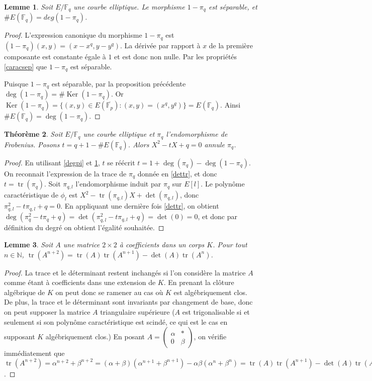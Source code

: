 \documentclass{article}
\theoremstyle{plain}%
\newtheorem{thm}{Théorème}[section]
\newtheorem{lem}[thm]{Lemme}
\theoremstyle{definition}%
\newcommand{\F}{\mathbb{F}}
\newcommand{\N}{\mathbb{N}}
\DeclareMathOperator{\tr}{tr}
\DeclareMathOperator{\Ker}{Ker}
\begin{document}
\begin{lem}
  \label{cardpi}
  Soit $E/\F_q$ une courbe elliptique. Le morphisme $1-\pi_q$ est séparable, et $\#E(\F_q) = deg(1 - \pi_q)$.
\end{lem}

\begin{proof}
  L'expression canonique du morphisme $1-\pi_q$ est $(1-\pi_q)(x, y) = (x-x^q, y-y^q)$. La dérivée par rapport à $x$ de la première composante est constante égale à $1$ et est donc non nulle. Par les propriétés \ref{caracsep} que $1-\pi_q$ est séparable.

  Puisque $1-\pi_q$ est séparable, par la proposition précédente $\deg(1-\pi_q) = \# \Ker(1-\pi_q)$. Or $\Ker(1-\pi_q) = \{(x, y) \in E(\overline{\F_p}) : (x, y) = (x^q, y^q) \} = E(\F_q)$. Ainsi $\# E(\F_q) = \deg(1-\pi_q)$.
\end{proof}

\begin{thm}
  \label{polcarac}
  Soit $E/\F_q$ une courbe elliptique et $\pi_q$ l'endomorphisme de Frobenius. Posons $t=q+1-\#E(\F_q)$. Alors $X^2 -tX + q = 0$ annule $\pi_q$.
\end{thm}

\begin{proof}
  En utilisant \ref{degpi} et \ref{cardpi}, $t$ se réécrit $t = 1 + \deg(\pi_q) - \deg(1-\pi_q)$. On reconnait l'expression de la trace de $\pi_q$ donnée en \ref{dettr}, et donc $t = \tr(\pi_q)$. Soit $\pi_{q, l}$ l'endomorphisme induit par $\pi_q$ sur $E[l]$. Le polynôme caractéristique de $\phi_l$ est $X^2 -\tr(\pi_{q,l}) X + \det(\pi_{q, l})$, donc $\pi_{q,l}^2 - t\pi_{q,l}+q = 0$. En appliquant une dernière fois \ref{dettr}, on obtient $\deg(\pi_{q}^2 - t\pi_{q}+q ) = \det (\pi_{q,l}^2 - t\pi_{q,l}+q ) = \det(0) = 0$, et donc par définition du degré on obtient l'égalité souhaitée.
\end{proof}

\begin{lem}
  Soit $A$ une matrice $2\times 2$ à coefficients dans un corps $K$. Pour tout $n\in\N$, $\tr(A^{n+2}) = \tr(A)\tr(A^{n+1}) - \det(A)\tr(A^n)$.
\end{lem}

\begin{proof}
  La trace et le déterminant restent inchangés si l'on considère la matrice $A$ comme étant à coefficients dans une extension de $K$. En prenant la clôture algébrique de $K$ on peut donc se ramener au cas où $K$ est algébriquement clos. De plus, la trace et le déterminant sont invariants par changement de base, donc on peut supposer la matrice $A$ triangulaire supérieure ($A$ est trigonalisable si et seulement si son polynôme caractéristique est scindé, ce qui est le cas en supposant $K$ algébriquement clos.) En posant $A = \begin{pmatrix} \alpha & * \\ 0 & \beta \end{pmatrix}$, on vérifie immédiatement que $\tr(A^{n+2}) = \alpha^{n+2} + \beta^{n+2} = (\alpha + \beta)(\alpha^{n+1} + \beta^{n+1}) - \alpha\beta(\alpha^n + \beta^n) = \tr(A)\tr(A^{n+1}) - \det(A)\tr(A^n)$.
\end{proof}
\end{document}
